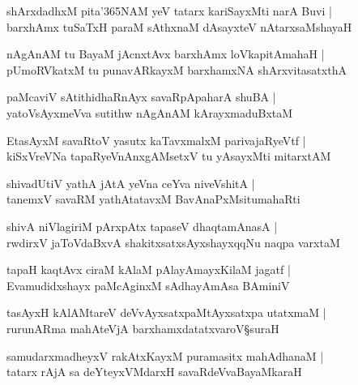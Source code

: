 \begin{shloka}
shArxdadhxM pita\char'365NAM yeV tatarx kariSayxMti narA Buvi |\\ barxhAmx tuSaTxH paraM sAthxnaM dAsayxteV nAtarxsaMshayaH
\end{shloka}

\begin{shloka}
nAgAnAM tu BayaM jAcnxtAvx barxhAmx loVkapitAmahaH |\\ pUmoRVkatxM tu punavARkayxM barxhamxNA shArxvitasatxthA
\end{shloka}

\begin{shloka}
paMcaviV sAtithidhaRnAyx savaRpApaharA shuBA |\\ yatoVsAyxmeVva sutithw nAgAnAM kArayxmaduBxtaM
\end{shloka}

\begin{shloka}
EtasAyxM savaRtoV yasutx kaTavxmalxM parivajaRyeVtf |\\ kiSxVreVNa tapaRyeVnAnxgAMsetxV tu yAsayxMti mitarxtAM
\end{shloka}

\begin{shloka}
shivadUtiV yathA jAtA yeVna ceYva niveVshitA |\\ tanemxV savaRM yathAtatavxM BavAnaPxMsitumahaRti
\end{shloka}

\begin{shloka}
shivA niVlagiriM pArxpAtx tapaseV dhaqtamAnasA |\\ rwdirxV jaToVdaBxvA shakitxsatxsAyxshayxqqNu naqpa varxtaM
\end{shloka}

\begin{shloka}
tapaH kaqtAvx ciraM kAlaM pAlayAmayxKilaM jagatf |\\
Evamudidxshayx paMcAginxM sAdhayAmAsa BAminiV
\end{shloka}

\begin{shloka}
tasAyxH kAlAMtareV deVvAyxsatxpaMtAyxsatxpa utatxmaM |\\ rurunARma mahAteVjA barxhamxdatatxvaroV\S suraH
\end{shloka}

\begin{shloka}
samudarxmadheyxV rakAtxKayxM puramasitx mahAdhanaM |\\ tatarx rAjA sa deYteyxVMdarxH savaRdeVvaBayaMkaraH
\end{shloka}

